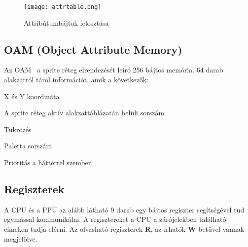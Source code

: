 \begin{figure}[H]
	\centering
	\texttt{[image: attrtable.png]}
	\caption{Attribútumbájtok felosztása}
	\label{fig:attr}
\end{figure}

\subsection{OAM (Object Attribute Memory)}

Az OAM~\cite{ppuref} a sprite réteg elrendezését leíró 256 bájtos memória. 64 darab alakzatról tárol információt, amik a következők:

\begin{compactitem}
	\item X és Y koordináta
	\item A sprite réteg aktív alakzattáblázatán belüli sorszám
	\item Tükrözés
	\item Paletta sorszám
	\item Prioritás a háttérrel szemben
\end{compactitem}

\subsection{Regiszterek}

A CPU és a PPU az alább látható 9 darab egy bájtos regiszter \cite{ppuref} segítségével tud egymással kommunikálni. A regisztereket a CPU a zárójelekben található címeken tudja elérni.
Az olvasható regiszterek \textbf{R}, az írhatók \textbf{W} betűvel vannak megjelölve.

\vspace{0.25cm}


